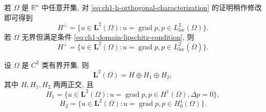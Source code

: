 \begin{Remark}
\label{rem:ch1-h-unbounded-domain}
若 $\Omega$ 是 $\mathbb R^n$ 中任意开集, 对 \eqref{eq:ch1-h-orthogonal-characterization} 的证明稍作修改即可得到
\begin{equation}
H^\perp=\{u\in\mathbf L^2(\Omega):u=\operatorname{grad}p, p\in L^2_{\mathrm{loc}}(\Omega)\}.
\label{eq:ch1-h-orthogonal-arbitrary-domain}
\end{equation}
若 $\Omega$ 无界但满足条件 \eqref{eq:ch1-domain-lipschitz-condition}, 则
\begin{equation}
H^\perp=\{u\in\mathbf L^2(\Omega):u=\operatorname{grad}p, p\in L^2_{\mathrm{loc}}(\overline\Omega)\}.
\label{eq:ch1-h-orthogonal-unbounded-lipschitz}
\end{equation}
\end{Remark}

\begin{Theorem}
\label{thm:ch1-helmholtz-decomposition}
设 $\Omega$ 是 $C^2$ 类有界开集. 则
\begin{equation}
\mathbf L^2(\Omega)=H\oplus H_1\oplus H_2,
\label{eq:ch1-l2-orthogonal-decomposition}
\end{equation}
其中 $H,H_1,H_2$ 两两正交, 且
\begin{equation}
H_1=\{u\in\mathbf L^2(\Omega):u=\operatorname{grad}p, p\in H^1(\Omega), \Delta p=0\},
\label{eq:ch1-h1-harmonic-gradient-space}
\end{equation}
\begin{equation}
H_2=\{u\in\mathbf L^2(\Omega):u=\operatorname{grad}p, p\in H_0^1(\Omega)\}.
\label{eq:ch1-h2-dirichlet-gradient-space}
\end{equation}
\end{Theorem}

